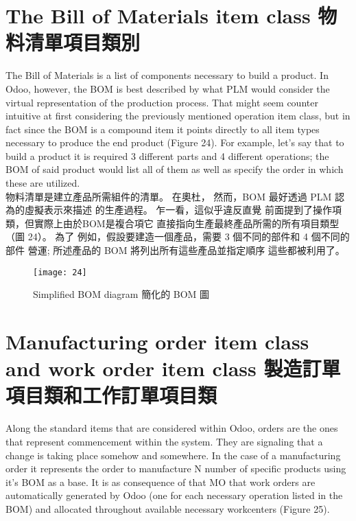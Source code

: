 \section{The Bill of Materials item class 物料清單項目類別 }

\fontsize{12}{2.5pt}\sectionef 
 {The Bill of Materials is a list of components necessary to build a product. In Odoo,
however, the BOM is best described by what PLM would consider the virtual representation
of the production process. That might seem counter intuitive at first considering the
previously mentioned operation item class, but in fact since the BOM is a compound item it
points directly to all item types necessary to produce the end product (Figure 24). For
example, let’s say that to build a product it is required 3 different parts and 4 different
operations; the BOM of said product would list all of them as well as specify the order in
which these are utilized.}\\[1pt]

\fontsize{12}{2.5pt}\sectionef  
{物料清單是建立產品所需組件的清單。 在奧杜，
然而，BOM 最好透過 PLM 認為的虛擬表示來描述
的生產過程。 乍一看，這似乎違反直覺
前面提到了操作項類，但實際上由於BOM是複合項它
直接指向生產最終產品所需的所有項目類型（圖 24）。 為了
例如，假設要建造一個產品，需要 3 個不同的部件和 4 個不同的部件
營運; 所述產品的 BOM 將列出所有這些產品並指定順序
這些都被利用了。}\\[15pt]

\begin{figure}[hbt!]
\begin{center}
\texttt{[image: 24]}
\caption{\Large Simplified BOM diagram  簡化的 BOM 圖}\label{fig.24}
\end{center}
\end{figure}

\section{Manufacturing order item class and work order item class  製造訂單項目類和工作訂單項目類 }

\fontsize{12}{2.5pt}\sectionef 
 {Along the standard items that are considered within Odoo, orders are the ones that
represent commencement within the system. They are signaling that a change is taking place
somehow and somewhere. In the case of a manufacturing order it represents the order to
manufacture N number of specific products using it’s BOM as a base. It is as consequence
of that MO that work orders are automatically generated by Odoo (one for each necessary
operation listed in the BOM) and allocated throughout available necessary workcenters
(Figure 25). }\\[1pt]


